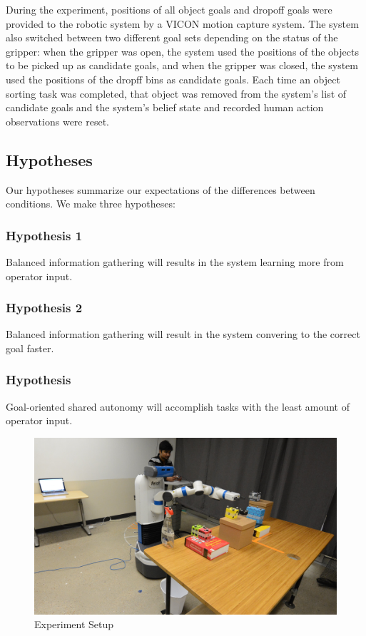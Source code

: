 \documentclass[conference]{IEEEtran}
\begin{document}

During the experiment, positions of all object goals and dropoff goals were provided to the robotic system by a VICON motion capture system. The system also switched between two different goal sets depending on the status of the gripper: when the gripper was open, the system used the positions of the objects to be picked up as candidate goals, and when the gripper was closed, the system used the positions of the dropff bins as candidate goals. Each time an object sorting task was completed, that object was removed from the system's list of candidate goals and the system's belief state and recorded human action observations were reset.

\subsection{Hypotheses}

Our hypotheses summarize our expectations of the differences between conditions. We make three hypotheses:
\subsubsection{Hypothesis 1} Balanced information gathering will results in the system learning more from operator input.
\subsubsection{Hypothesis 2} Balanced information gathering will result in the system convering to the correct goal faster.
\subsubsection{Hypothesis} Goal-oriented shared autonomy will accomplish tasks with the least amount of operator input.

\begin{figure}
\includegraphics[width=\columnwidth]{figures/task_setup-v2.jpg}
\caption{Experiment Setup}
\label{exp_setup}
\end{figure}
\end{document}
